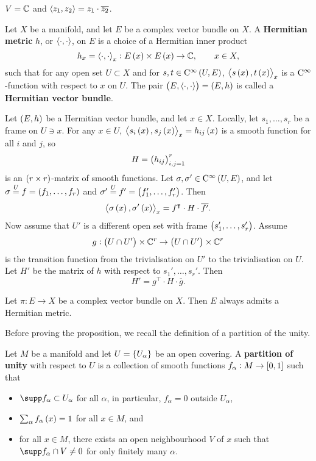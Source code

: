 \begin{example*}
$ V = \mathbb{C} $ and $ \left\langle z_1, z_2 \right\rangle = z_1 \cdot \overline{z_2} $.
\end{example*}

\pagebreak

\begin{definition}
Let $ X $ be a manifold, and let $ E $ be a complex vector bundle on $ X $. A \textbf{Hermitian metric} $ h $, or $ \left\langle \cdot, \cdot \right\rangle $, on $ E $ is a choice of a Hermitian inner product
$$ h_x = \abr{\cdot, \cdot}_x : E\br{x} \times E\br{x} \to \CC, \qquad x \in X, $$
such that for any open set $ U \subset X $ and for $ s, t \in \C^\infty\br{U, E} $, $ \abr{s\br{x}, t\br{x}}_x $ is a $ \mathrm{C}^\infty $-function with respect to $ x $ on $ U $. The pair $ \br{E, \abr{\cdot, \cdot}} = \br{E, h} $ is called a \textbf{Hermitian vector bundle}.
\end{definition}

Let $ \br{E, h} $ be a Hermitian vector bundle, and let $ x \in X $. Locally, let $ s_1, \dots, s_r $ be a frame on $ U \ni x $. For any $ x \in U $, $ \abr{s_i\br{x}, s_j\br{x}}_x = h_{ij}\br{x} $ is a smooth function for all $ i $ and $ j $, so
$$ H = \br{h_{ij}}_{i, j = 1}^r $$
is an $ \br{r \times r} $-matrix of smooth functions. Let $ \sigma, \sigma' \in \C^\infty\br{U, E} $, and let $ \sigma \overset{U}{=} f = \br{f_1, \dots, f_r} $ and $ \sigma' \overset{U}{=} f' = \br{f_1', \dots, f_r'} $. Then
$$ \abr{\sigma\br{x}, \sigma'\br{x}}_x = f^\intercal \cdot H \cdot \overline{f'}. $$
Now assume that $ U' $ is a different open set with frame $ \br{s_1', \dots, s_r'} $. Assume
$$ g : \br{U \cap U'} \times \CC^r \to \br{U \cap U'} \times \CC^r $$
is the transition function from the trivialisation on $ U' $ to the trivialisation on $ U $. Let $ H' $ be the matrix of $ h $ with respect to $ s_1', \dots, s_r' $. Then
$$ H' = g^\intercal \cdot H \cdot \overline{g}. $$

\begin{proposition}
Let $ \pi : E \to X $ be a complex vector bundle on $ X $. Then $ E $ always admits a Hermitian metric.
\end{proposition}

Before proving the proposition, we recall the definition of a partition of the unity.

\begin{definition}
Let $ M $ be a manifold and let $ U = \cbr{U_\alpha} $ be an open covering. A \textbf{partition of unity} with respect to $ U $ is a collection of smooth functions $ f_\alpha : M \to \sbr{0, 1} $ such that
\begin{itemize}
\item $ \supp f_\alpha \subset U_\alpha $ for all $ \alpha $, in particular, $ f_\alpha = 0 $ outside $ U_\alpha $,
\item $ \sum_\alpha f_\alpha\br{x} = 1 $ for all $ x \in M $, and
\item for all $ x \in M $, there exists an open neighbourhood $ V $ of $ x $ such that $ \supp f_\alpha \cap V \ne 0 $ for only finitely many $ \alpha $.
\end{itemize}
\end{definition}

